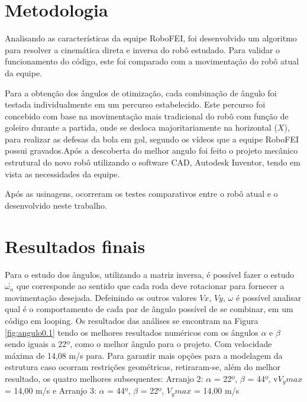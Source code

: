 \documentclass[a4paper,10pt,twocolumn,fleqn]{article}
\begin{document}
    \section{Metodologia}

     Analisando as características da equipe RoboFEI, foi desenvolvido um algoritmo para resolver a cinemática direta e inversa do robô estudado. Para validar o funcionamento do código, este foi comparado com a movimentação do robô atual da equipe.
    
     Para a obtenção dos ângulos de otimização, cada combinação de ângulo foi testada individualmente em um percurso estabelecido. Este percurso foi concebido com base na movimentação mais tradicional do robô com função de goleiro durante a partida, onde se desloca majoritariamente na horizontal ($X$), para realizar as defesas da bola em gol, segundo os vídeos que a equipe RoboFEI possui gravados.Após a descoberta do melhor angulo foi feito o projeto mecânico estrutural do novo robô utilizando o software CAD, Autodesk Inventor, tendo em vista as necessidades da equipe. 
    
      Após as usinagens, ocorreram os testes comparativos entre o robô atual e o desenvolvido neste trabalho.
    
    \section{Resultados finais}
    
    Para o estudo dos ângulos, utilizando a matriz inversa, é possível fazer o estudo $\bar{\omega_n}$ que corresponde ao sentido que cada roda deve rotacionar para fornecer a movimentação desejada. Defeinindo os outros valores $Vx$, $Vy$, $\omega$  é possível analisar qual é o comportamento de cada par de ângulo possível de se combinar, em um código em looping. Os resultados das  análises se encontram na Figura \ref{fig:angulo0.1} tendo os melhores resultados numéricos com os ângulos $\alpha$ e $\beta$ sendo iguais a 22º, como o melhor ângulo para o projeto. Com velocidade máxima de 14,08 m/s para. Para garantir mais opções para a modelagem da estrutura caso ocorram restrições geométricas, retiraram-se, além do melhor resultado, os quatro melhores subsequentes: Arranjo 2: $\alpha$ = 22º, $\beta$ = 44º, v$V_y max$ = 14,00 m/s e Arranjo 3: $\alpha$ = 44º, $\beta$ = 22º, $V_y max$ = 14,00 m/s
\end{document}
